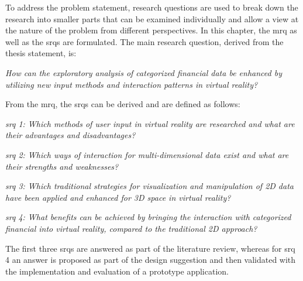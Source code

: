 \newcommand{\mrqtext}{How can the exploratory analysis of categorized financial data be enhanced by utilizing new input methods and interaction patterns in virtual reality?}

\newcommand{\srqonetext}{Which methods of user input in virtual reality are researched and what are their advantages and disadvantages?}
\newcommand{\srqtwotext}{Which ways of interaction for multi-dimensional data exist and what are their strengths and weaknesses?}
\newcommand{\srqthreetext}{Which traditional strategies for visualization and manipulation of 2D data have been applied and enhanced for 3D space in virtual reality?}
\newcommand{\srqfourtext}{What benefits can be achieved by bringing the interaction with categorized financial into virtual reality, compared to the traditional 2D approach?}

To address the problem statement, research questions are used to break down the research into smaller parts that can be examined individually and allow a view at the nature of the problem from different perspectives. In this chapter, the \gls{mrq} as well as the \glspl{srq} are formulated. \newline
The main research question, derived from the thesis statement, is:
\begin{framed}
	\textit{\mrqtext}
\end{framed} \label{MRQ}
From the \gls{mrq}, the \glspl{srq} can be derived and are defined as follows:
\begin{framed}
	\textit{\gls{srq} 1: \srqonetext}
\end{framed} \label{SRQ1}
\begin{framed}
	\textit{\gls{srq} 2: \srqtwotext}
\end{framed} \label{SRQ2}
\begin{framed}
	\textit{\gls{srq} 3: \srqthreetext}
\end{framed} \label{SRQ3}
 \begin{framed}
 	\textit{\gls{srq} 4: \srqfourtext}
 \end{framed} \label{SRQ4}
The first three \glspl{srq} are answered as part of the literature review, whereas for \gls{srq} 4 an answer is proposed as part of the design suggestion and then validated with the implementation and evaluation of a prototype application.



